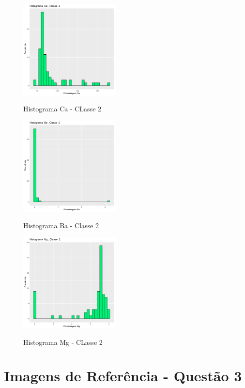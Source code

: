 \documentclass[conference]{IEEEtran}
\begin{document}
\begin{figure}[h]
\caption{Histograma Ca - CLasse 2}
\centering %
\includegraphics[width=5cm]{images/pt2/HistogramaCa_Classe2.png} %
\label{figura:histogramaal}
\end{figure}


\begin{figure}[h]
\caption{Histograma Ba - Classe 2}
\centering %
\includegraphics[width=5cm]{images/pt2/HistogramaBa_Classe2.png} %
\label{figura:histogramaal}
\end{figure}


\begin{figure}[h]
\caption{Histograma Mg - CLasse 2}
\centering %
\includegraphics[width=5cm]{images/pt2/HistogramaMg_Classe2.png} %
\label{figura:histogramaal}
\end{figure}


\newpage %
\section{Imagens de Referência - Questão 3}
\end{document}
